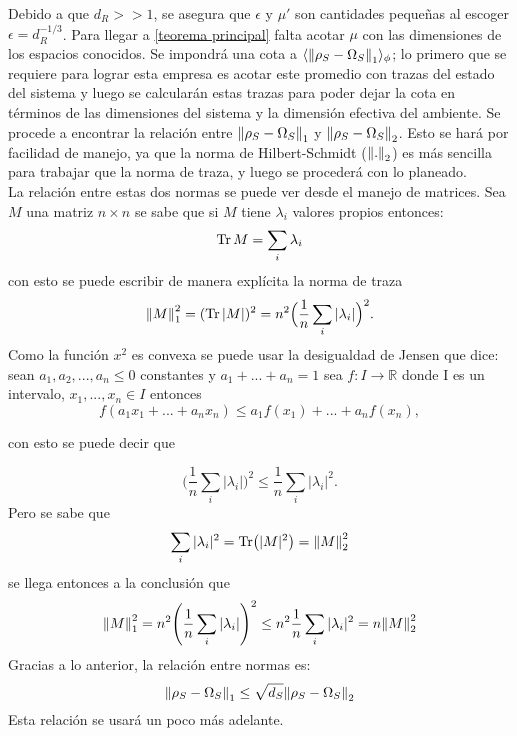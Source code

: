 Debido a que $d_{R}>>1$, se asegura que $\epsilon$ y $\mu'$ son cantidades pequeñas al escoger $\epsilon=d_{R}^{-1/3}$. Para llegar a \ref{teorema principal} falta acotar $\mu$ con las dimensiones de los espacios conocidos. Se impondrá una cota a $\langle \norm{\rho_{S} -\Omega_{S}}_{1} \rangle_{\phi}$; lo primero que se requiere para lograr esta empresa es acotar este promedio con trazas del estado del sistema y luego se calcularán estas trazas para poder dejar la cota en términos de las dimensiones del sistema y la dimensión efectiva del ambiente. Se procede a encontrar la relación entre $\norm{\rho_{S} -\Omega_{S}}_{1}$ y $\norm{\rho_{S} -\Omega_{S}}_{2}$. Esto se hará por facilidad de manejo, ya que la norma de Hilbert-Schmidt ($\norm{.}_{2}$) es más sencilla para trabajar que la norma de traza, y luego se procederá con lo planeado.
\\
La relación entre estas dos normas se puede ver desde el manejo de matrices. Sea $M$ una matriz $n \times n$ se sabe que si $M$ tiene $\lambda_{i}$ valores propios entonces:
\begin{equation}
\Tr M= \sum_{i} \lambda_{i}
\end{equation}
con esto se puede escribir de manera explícita la norma de traza 
\begin{equation}
\norm{M}_{1}^2=(\Tr|M|)^{2}=n^{2} \Big( \frac{1}{n}\sum_{i} |\lambda_{i}| \Big)^{2}.
\end{equation}
Como la función $x^{2}$ es convexa se puede usar la desigualdad de Jensen que dice: sean $a_{1},a_{2},...,a_{n} \le 0$ constantes y $a_{1} +...+a_{n}=1$ sea $f: I \to \mathbb{R}$ donde I es un intervalo, $x_{1},...,x_{n} \in I$ entonces
\begin{equation}
f(a_{1}x_{1}+...+a_{n}x_{n}) \le a_{1}f(x_{1})+...+a_{n}f(x_{n}),
\end{equation}

con esto se puede decir que

\begin{equation}
\Big( \frac{1}{n}\sum_{i} |\lambda_{i}| \Big)^{2} \le \frac{1}{n}\sum_{i} |\lambda_{i}|^{2}.
\end{equation}
Pero se sabe que 
\begin{equation}
\sum_{i} |\lambda_{i}|^2= \Tr(|M|^2)=\norm{M}_{2}^{2}
\end{equation}
se llega entonces a la conclusión que 
\begin{equation}
\norm{M}_{1}^{2} = n^{2}\Bigg( \frac{1}{n} \sum_{i}| \lambda_{i} | \Bigg)^{2} \le  n^{2} \frac{1}{n} \sum_{i} | \lambda_{i} |^{2}= n\norm{M}_{2}^{2}
\end{equation}
Gracias a lo anterior, la relación entre normas es:
\begin{equation}\label{eq:0}
\norm{\rho_{S} - \Omega_{S}}_{1} \le \sqrt{d_{S}}\norm{\rho_{S} - \Omega_{S}}_{2}
\end{equation}
Esta relación se usará un poco más adelante.\\

